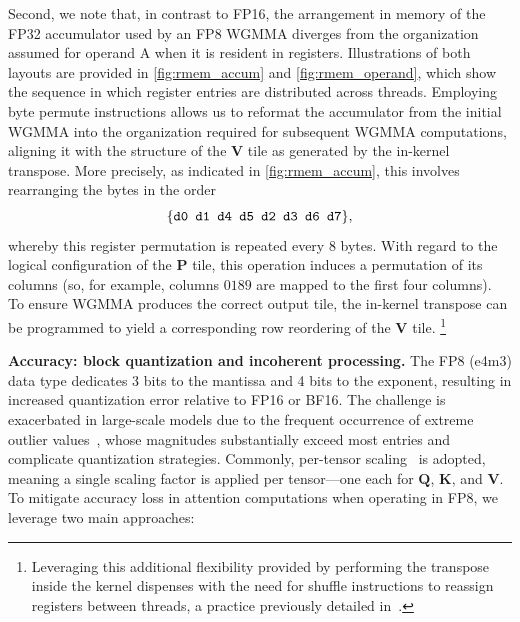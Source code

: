Second, we note that, in contrast to FP16, the arrangement in memory of the FP32 accumulator used by an FP8 WGMMA diverges from the organization assumed for operand A when it is resident in registers. Illustrations of both layouts are provided in \cref{fig:rmem_accum} and \cref{fig:rmem_operand}, which show the sequence in which register entries are distributed across threads. Employing byte permute instructions allows us to reformat the accumulator from the initial WGMMA into the organization required for subsequent WGMMA computations, aligning it with the structure of the $\mathbf{V}$ tile as generated by the in-kernel transpose. More precisely, as indicated in \cref{fig:rmem_accum}, this involves rearranging the bytes in the order
$$\{ \verb|d0 d1 d4 d5 d2 d3 d6 d7| \},$$
whereby this register permutation is repeated every 8 bytes. With regard to the logical configuration of the $\mathbf{P}$ tile, this operation induces a permutation of its columns (so, for example, columns $0189$ are mapped to the first four columns). To ensure WGMMA produces the correct output tile, the in-kernel transpose can be programmed to yield a corresponding row reordering of the $\mathbf{V}$ tile. \footnote{Leveraging this additional flexibility provided by performing the transpose inside the kernel dispenses with the need for shuffle instructions to reassign registers between threads, a practice previously detailed in~\citep{colfax_fp8_flashattention_2024}.}

\textbf{Accuracy: block quantization and incoherent processing.} The FP8 (e4m3) data type dedicates 3 bits to the mantissa and 4 bits to the exponent, resulting in increased quantization error relative to FP16 or BF16. The challenge is exacerbated in large-scale models due to the frequent occurrence of extreme outlier values~\citep{dettmers2208llm, sun2024massive}, whose magnitudes substantially exceed most entries and complicate quantization strategies. Commonly, per-tensor scaling~\citep{micikevicius2022fp8} is adopted, meaning a single scaling factor is applied per tensor—one each for $\mathbf{Q}$, $\mathbf{K}$, and $\mathbf{V}$. To mitigate accuracy loss in attention computations when operating in FP8, we leverage two main approaches:

